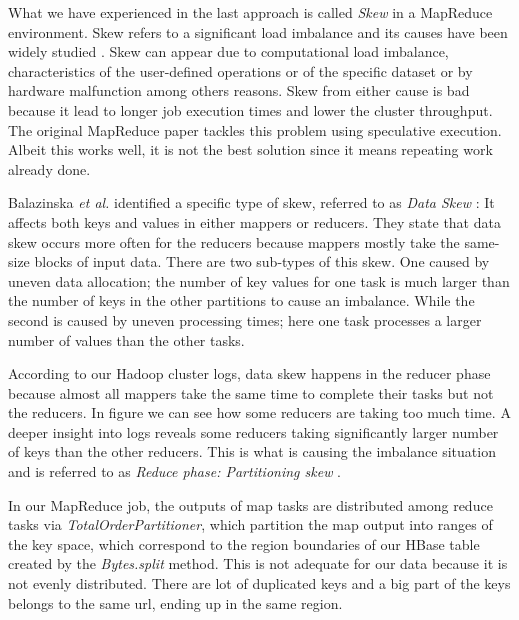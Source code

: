 What we have experienced in the last approach is called \textit{Skew} in a MapReduce environment. Skew refers to a significant load imbalance and its causes have been widely studied \cite{ananthanarayanan2010reining} \cite{dean2008mapreduce} \cite{walton1991taxonomy}. Skew can appear due to computational load imbalance, characteristics of the user-defined operations or of the specific dataset or by hardware malfunction among others reasons. Skew from either cause is bad because it lead to longer job execution times and lower the cluster throughput. The original MapReduce paper \cite{dean2008mapreduce} tackles this problem using speculative execution. Albeit this works well, it is not the best solution since it means repeating work already done.
\par
Balazinska \textit{et al.} identified a specific type of skew, referred to as \textit{Data Skew} \cite{kwon2013managing}: It affects both keys and values in either mappers or reducers. They state that data skew occurs more often for the reducers because mappers mostly take the same-size blocks of input data. There are two sub-types of this skew. One caused by uneven data allocation; the number of key values for one task is much larger than the number of keys in the other partitions to cause an imbalance. While the second is caused by uneven processing times; here one task processes a larger number of values than the other tasks. 
\par
According to our Hadoop cluster logs, data skew happens in the reducer phase because almost all mappers take the same time to complete their tasks but not the reducers. In figure  we can see how some reducers are taking too much time. A deeper insight into logs reveals some reducers taking significantly larger number of keys than the other reducers. This is what is causing the imbalance situation and is referred to as \textit{Reduce phase: Partitioning skew} \cite{kwon2012skewtune}.
\par
In our MapReduce job, the outputs of map tasks are distributed among reduce tasks via \textit{TotalOrderPartitioner}, which partition the map output into ranges of the key space, which correspond to the region boundaries of our HBase table created by the \textit{Bytes.split} method. This is not adequate for our data because it is not evenly distributed. There are lot of duplicated keys and a big part of the keys  belongs to the same url, ending up in the same region.
\par
